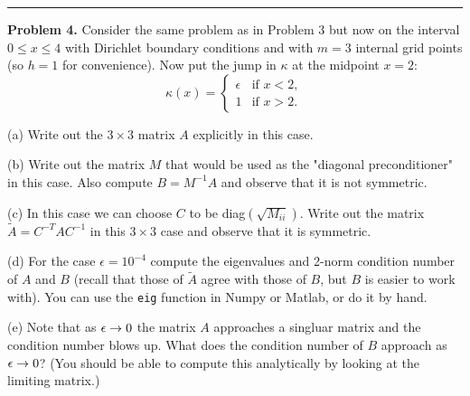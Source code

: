 \documentclass[10pt]{article}
\begin{document}



\vskip 1cm
\hrule
{\bf Problem 4.}
Consider the same problem as in Problem 3 but now on the interval 
$0\leq x \leq 4$ with Dirichlet boundary conditions and with $m=3$ internal
grid points (so $h=1$ for convenience).  Now put the jump in $\kappa$ at the
midpoint $x=2$:
\[
\kappa(x) = \begin{cases}
\epsilon & \text{if~} x <2,\\
1 & \text{if~} x > 2.
\end{cases}
\]

(a) Write out the $3\times 3$ matrix $A$ explicitly in this case.

(b) Write out the matrix $M$ that would be used as the "diagonal
preconditioner" in this case.  Also compute $B = M^{-1}A$ and observe
that it is not symmetric.

(c) In this case we can choose $C$ to be diag$(\sqrt{M_{ii}})$. Write out the
matrix $\tilde A = C^{-T}AC^{-1}$ in this $3\times 3$ case and observe that
it is symmetric.

(d) For the case $\epsilon = 10^{-4}$ compute the eigenvalues and
2-norm condition number of $A$ and $B$ (recall that those of $\tilde
A$ agree with those of $B$, but $B$ is easier to work with).  You
can use the {\tt eig} function in Numpy or Matlab, or do it by hand.

(e)  Note that as $\epsilon \rightarrow 0$ the matrix $A$ approaches a
singluar matrix and the condition number blows up.  What does the
condition number of $B$ approach as $\epsilon \rightarrow 0$?
(You should be able to compute this analytically by looking at the
limiting matrix.)



\end{document}
